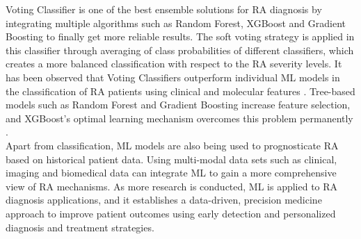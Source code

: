 \documentclass[10pt]{NSP1}
\begin{document}
	Voting Classifier is one of the best ensemble solutions for RA diagnosis by integrating multiple algorithms such as Random Forest, XGBoost and Gradient Boosting to finally get more reliable results. The soft voting strategy is applied in this classifier through averaging of class probabilities of different classifiers, which creates a more balanced classification with respect to the RA severity levels. It has been observed that Voting Classifiers outperform individual ML models in the classification of RA patients using clinical and molecular features \cite{nguyen2022deep}. Tree-based models such as Random Forest and Gradient Boosting increase feature selection, and XGBoost's optimal learning mechanism overcomes this problem permanently \cite{ahmad2026m3l}.\\
	Apart from classification, ML models are also being used to prognosticate RA based on historical patient data. Using multi-modal data sets such as clinical, imaging and biomedical data can integrate ML to gain a more comprehensive view of RA mechanisms. As more research is conducted, ML is applied to RA diagnosis applications, and it establishes a data-driven, precision medicine approach to improve patient outcomes using early detection and personalized diagnosis and treatment strategies.
	
\end{document}
